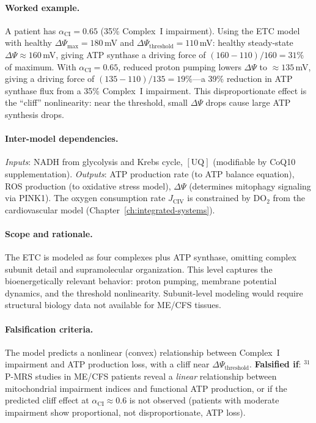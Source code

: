 \paragraph{Worked example.}
A patient has $\alpha_{\text{CI}} = 0.65$ (35\% Complex~I impairment). Using the ETC model with healthy $\Delta\Psi_{\max} = 180$\,mV and $\Delta\Psi_{\text{threshold}} = 110$\,mV: healthy steady-state $\Delta\Psi \approx 160$\,mV, giving ATP synthase a driving force of $(160 - 110)/160 = 31\%$ of maximum. With $\alpha_{\text{CI}} = 0.65$, reduced proton pumping lowers $\Delta\Psi$ to $\approx 135$\,mV, giving a driving force of $(135 - 110)/135 = 19\%$---a 39\% reduction in ATP synthase flux from a 35\% Complex~I impairment. This disproportionate effect is the ``cliff'' nonlinearity: near the threshold, small $\Delta\Psi$ drops cause large ATP synthesis drops.

\paragraph{Inter-model dependencies.}
\emph{Inputs}: NADH from glycolysis and Krebs cycle, $[\text{UQ}]$ (modifiable by CoQ10 supplementation). \emph{Outputs}: ATP production rate (to ATP balance equation), ROS production (to oxidative stress model), $\Delta\Psi$ (determines mitophagy signaling via PINK1). The oxygen consumption rate $J_{\text{CIV}}$ is constrained by DO$_2$ from the cardiovascular model (Chapter~\ref{ch:integrated-systems}).

\paragraph{Scope and rationale.}
The ETC is modeled as four complexes plus ATP synthase, omitting complex subunit detail and supramolecular organization. This level captures the bioenergetically relevant behavior: proton pumping, membrane potential dynamics, and the threshold nonlinearity. Subunit-level modeling would require structural biology data not available for ME/CFS tissues.

\paragraph{Falsification criteria.}
The model predicts a nonlinear (convex) relationship between Complex~I impairment and ATP production loss, with a cliff near $\Delta\Psi_{\text{threshold}}$. \textbf{Falsified if}: $^{31}$P-MRS studies in ME/CFS patients reveal a \emph{linear} relationship between mitochondrial impairment indices and functional ATP production, or if the predicted cliff effect at $\alpha_{\text{CI}} \approx 0.6$ is not observed (patients with moderate impairment show proportional, not disproportionate, ATP loss).

